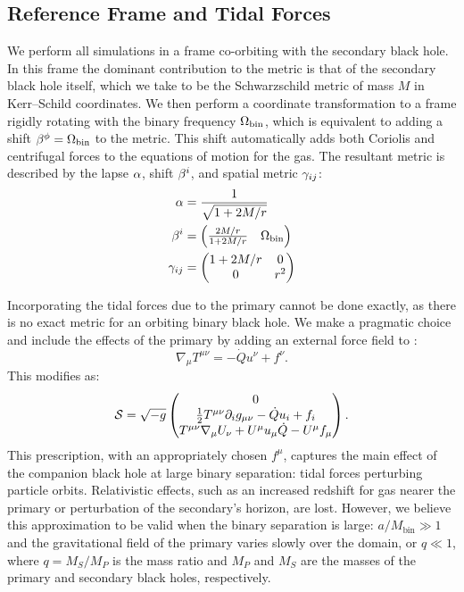 \subsection{Reference Frame and Tidal Forces}

We perform all simulations in a frame co-orbiting with the secondary black hole.  In this frame the dominant contribution to the metric is that of the secondary black hole itself, which we take to be the Schwarzschild metric of mass $M$ in Kerr--Schild coordinates.  We then perform a coordinate transformation to a frame rigidly rotating with the binary frequency $\Omega_\text{bin}$, which is equivalent to adding a shift $\beta^\phi = \Omega_\text{bin}$ to the metric.  This shift automatically adds both Coriolis and centrifugal forces to the equations of motion for the gas.  The resultant metric is described by the lapse $\alpha$, shift $\beta^i$, and spatial metric $\gamma_{ij}$:
\begin{align}
	\alpha &= \frac{1}{\sqrt{1+2M/r}} \\
	\beta^i &= \begin{pmatrix} \frac{2M/r}{1+2M/r} & \Omega_\text{bin} \end{pmatrix} \\
	\gamma_{ij} &= \begin{pmatrix} 1+2M/r & 0 \\ 0 & r^2 \end{pmatrix}
\end{align}

Incorporating the tidal forces due to the primary cannot be done exactly, as there is no exact metric for an orbiting binary black hole.  We make a pragmatic choice and include the effects of the primary by adding an external force field to :
\begin{equation}
	\nabla_\mu T^{\mu\nu} = -\dot{Q} u^\nu + f^\nu . 
\end{equation}
This modifies  as:
\begin{equation}
	\mathcal{S} = \sqrt{-g} \begin{pmatrix} 0 \\
                        \frac{1}{2}T^{\mu\nu}\pd_i g_{\mu\nu} - \dot{Q}u_i  + f_i \\
                        T^{\mu\nu}\nabla_\mu U_\nu + U^\mu u_\mu \dot{Q} - U^\mu f_\mu \end{pmatrix} .\eqlabel{sourcesF}
\end{equation}
This prescription, with an appropriately chosen $f^\mu$, captures the main effect of the companion black hole at large binary separation: tidal forces perturbing particle orbits.  Relativistic effects, such as an increased redshift for gas nearer the primary or perturbation of the secondary's horizon, are lost. However, we believe this approximation to be valid when the binary separation is large: $a/M_\text{bin} \gg 1$ and the gravitational field of the primary varies slowly over the domain, or $q \ll 1$, where $q = M_S / M_P$ is the mass ratio and $M_P$ and $M_S$ are the masses of the primary and secondary black holes, respectively.

